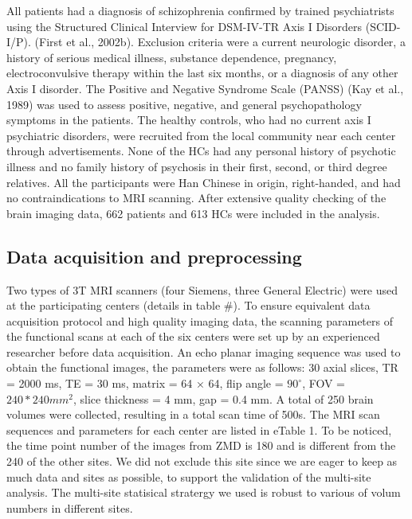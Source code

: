 \documentclass[preprint,authoryear,review,12pt,times]{elsarticle}
\begin{document}
All patients had a diagnosis of schizophrenia confirmed by trained psychiatrists using the Structured Clinical Interview for DSM-IV-TR Axis I Disorders (SCID-I/P). (First et al., 2002b). Exclusion criteria were a current neurologic disorder, a history of serious medical illness, substance dependence, pregnancy, electroconvulsive therapy within the last six months, or a diagnosis of any other Axis I disorder. The Positive and Negative Syndrome Scale (PANSS)  (Kay et al., 1989) was used to assess positive, negative, and general psychopathology symptoms in the patients. The healthy controls, who had no current axis I psychiatric disorders, were recruited from the local community near each center through advertisements. None of the HCs had any personal history of psychotic illness and no family history of psychosis in their first, second, or third degree relatives. All the participants were Han Chinese in origin, right-handed, and had no contraindications to MRI scanning. After extensive quality checking of the brain imaging data, 662 patients and 613 HCs were included in the analysis.
 
 
 
\subsection*{Data acquisition and preprocessing}
 
 
Two types of 3T MRI scanners (four Siemens, three General Electric) were used at the participating centers (details in table \#). To ensure equivalent data acquisition protocol and high quality imaging data, the scanning parameters of the functional scans at each of the six centers were set up by an experienced researcher before data acquisition. An echo planar imaging sequence was used to obtain the functional images, the parameters were as follows: 30 axial slices, TR = 2000 ms, TE = 30 ms, matrix = 64 × 64, flip angle = $90^{\circ}$, FOV = $240*240 mm^{2}$, slice thickness = 4 mm, gap = 0.4 mm. A total of 250 brain volumes were collected, resulting in a total scan time of 500s. The MRI scan sequences and parameters for each center are listed in eTable 1. To be noticed, the time point number of the images from ZMD is 180 and is different from the 240 of the other sites. We did not exclude this site since we are eager to keep as much data and sites as possible, to support the validation of the multi-site analysis. The multi-site statisical stratergy we used is robust to various of volum numbers in different sites.    
\end{document}
